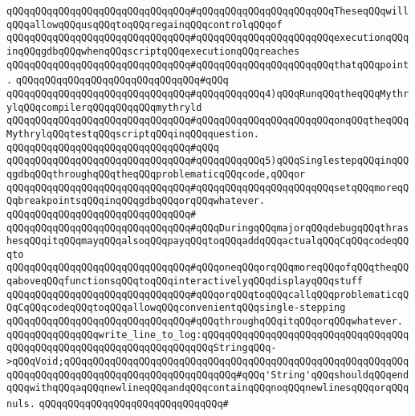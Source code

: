 \verb|qQQqqQQqqQQqqQQqqQQqqQQqqQQqqQQq#qQQqqQQqqQQqqQQqqQQqqQQqTheseqQQqwillqQQqallowqQQqusqQQqtoqQQqregainqQQqcontrolqQQqof|\newline
\verb|qQQqqQQqqQQqqQQqqQQqqQQqqQQqqQQq#qQQqqQQqqQQqqQQqqQQqqQQqexecutionqQQqinqQQqgdbqQQqwhenqQQqscriptqQQqexecutionqQQqreaches|\newline
\verb|qQQqqQQqqQQqqQQqqQQqqQQqqQQqqQQq#qQQqqQQqqQQqqQQqqQQqqQQqthatqQQqpoint.|\newline
\verb|qQQqqQQqqQQqqQQqqQQqqQQqqQQqqQQq#qQQq|\newline
\verb|qQQqqQQqqQQqqQQqqQQqqQQqqQQqqQQq#qQQqqQQqqQQq4)qQQqRunqQQqtheqQQqMythrylqQQqcompilerqQQqqQQqqQQqmythryld|\newline
\verb|qQQqqQQqqQQqqQQqqQQqqQQqqQQqqQQq#qQQqqQQqqQQqqQQqqQQqqQQqonqQQqtheqQQqMythrylqQQqtestqQQqscriptqQQqinqQQqquestion.|\newline
\verb|qQQqqQQqqQQqqQQqqQQqqQQqqQQqqQQq#qQQq|\newline
\verb|qQQqqQQqqQQqqQQqqQQqqQQqqQQqqQQq#qQQqqQQqqQQq5)qQQqSinglestepqQQqinqQQqgdbqQQqthroughqQQqtheqQQqproblematicqQQqcode,qQQqor|\newline
\verb|qQQqqQQqqQQqqQQqqQQqqQQqqQQqqQQq#qQQqqQQqqQQqqQQqqQQqqQQqsetqQQqmoreqQQqbreakpointsqQQqinqQQqgdbqQQqorqQQqwhatever.|\newline
\verb|qQQqqQQqqQQqqQQqqQQqqQQqqQQqqQQq#|\newline
\verb|qQQqqQQqqQQqqQQqqQQqqQQqqQQqqQQq#qQQqDuringqQQqmajorqQQqdebugqQQqthrashesqQQqitqQQqmayqQQqalsoqQQqpayqQQqtoqQQqaddqQQqactualqQQqCqQQqcodeqQQqto|\newline
\verb|qQQqqQQqqQQqqQQqqQQqqQQqqQQqqQQq#qQQqoneqQQqorqQQqmoreqQQqofqQQqtheqQQqaboveqQQqfunctionsqQQqtoqQQqinteractivelyqQQqdisplayqQQqstuff|\newline
\verb|qQQqqQQqqQQqqQQqqQQqqQQqqQQqqQQq#qQQqorqQQqtoqQQqcallqQQqproblematicqQQqCqQQqcodeqQQqtoqQQqallowqQQqconvenientqQQqsingle-stepping|\newline
\verb|qQQqqQQqqQQqqQQqqQQqqQQqqQQqqQQq#qQQqthroughqQQqitqQQqorqQQqwhatever.|\newline
\newline
\verb|qQQqqQQqqQQqqQQqwrite_line_to_log:qQQqqQQqqQQqqQQqqQQqqQQqqQQqqQQqqQQqqQQqqQQqqQQqqQQqqQQqqQQqqQQqqQQqqQQqStringqQQq->qQQqVoid;qQQqqQQqqQQqqQQqqQQqqQQqqQQqqQQqqQQqqQQqqQQqqQQqqQQqqQQqqQQqqQQqqQQqqQQqqQQqqQQqqQQqqQQqqQQqqQQqqQQq#qQQq'String'qQQqshouldqQQqendqQQqwithqQQqaqQQqnewlineqQQqandqQQqcontainqQQqnoqQQqnewlinesqQQqorqQQqnuls.|\newline
\verb|qQQqqQQqqQQqqQQqqQQqqQQqqQQqqQQq#|\newline
